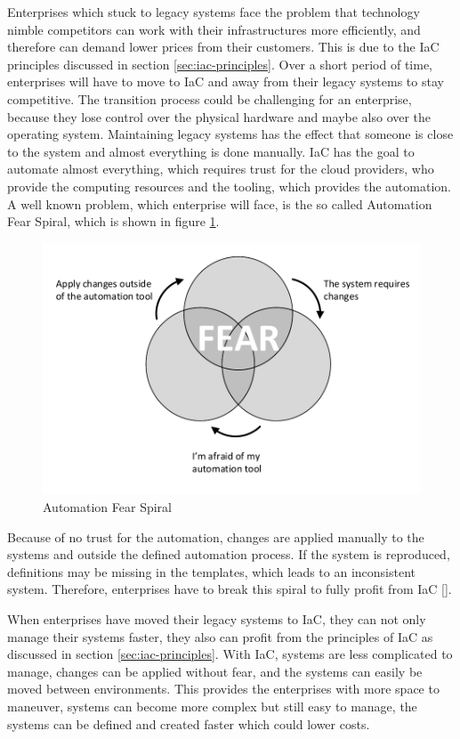 Enterprises which stuck to legacy systems face the problem that technology nimble competitors can work with their infrastructures more efficiently, and therefore can demand lower prices from their customers. This is due to the IaC principles discussed in section \ref{sec:iac-principles}. Over a short period of time, enterprises will have to move to IaC and away from their legacy systems to stay competitive. The transition process could be challenging for an enterprise, because they lose control over the physical hardware and maybe also over the operating system. Maintaining legacy systems has the effect that someone is close to the system and almost everything is done manually. IaC has the goal to automate almost everything, which requires trust for the cloud providers, who provide the computing resources and the tooling, which provides the automation. A well known problem, which enterprise will face, is the so called Automation Fear Spiral, which is shown in figure \ref{fig:automation-fear-spiral}.

\begin{figure}[htbp]
	\centering
	\includegraphics[scale=.9]{images/automation-fear-spiral.pdf}
	\caption{Automation Fear Spiral}
	\label{fig:automation-fear-spiral}
\end{figure} 
Because of no trust for the automation, changes are applied manually to the systems and outside the defined automation process. If the system is reproduced, definitions may be missing in the templates, which leads to an inconsistent system. Therefore, enterprises have to break this spiral to fully profit from IaC [\cite[p. 9]{Morris2016}]. 

When enterprises have moved their legacy systems to IaC, they can not only manage their systems faster, they also can profit from the principles of IaC as discussed in section \ref{sec:iac-principles}. With IaC, systems are less complicated to manage, changes can be applied without fear, and the systems can easily be moved between environments. This provides the enterprises with more space to maneuver, systems can become more complex but still easy to manage, the systems can be defined and created faster which could lower costs.    

